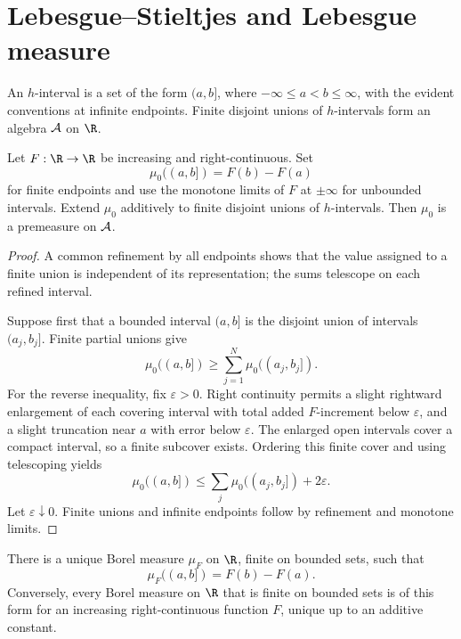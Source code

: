 \section{Lebesgue--Stieltjes and Lebesgue measure}

\begin{de}
An $h$-interval is a set of the form $(a,b]$, where $-\infty\leq a<b\leq\infty$, with the evident conventions at infinite endpoints. Finite disjoint unions of $h$-intervals form an algebra $\mathcal{A}$ on $\R$.
\end{de}

\begin{thm}
Let $F:\R\to\R$ be increasing and right-continuous. Set
\[
\mu_0((a,b])=F(b)-F(a)
\]
for finite endpoints and use the monotone limits of $F$ at $\pm\infty$ for unbounded intervals. Extend $\mu_0$ additively to finite disjoint unions of $h$-intervals. Then $\mu_0$ is a premeasure on $\mathcal{A}$.
\end{thm}

\begin{proof}
A common refinement by all endpoints shows that the value assigned to a finite union is independent of its representation; the sums telescope on each refined interval.

Suppose first that a bounded interval $(a,b]$ is the disjoint union of intervals $(a_j,b_j]$. Finite partial unions give
\[
\mu_0((a,b])\geq\sum_{j=1}^N\mu_0((a_j,b_j]).
\]
For the reverse inequality, fix $\varepsilon>0$. Right continuity permits a slight rightward enlargement of each covering interval with total added $F$-increment below $\varepsilon$, and a slight truncation near $a$ with error below $\varepsilon$. The enlarged open intervals cover a compact interval, so a finite subcover exists. Ordering this finite cover and using telescoping yields
\[
\mu_0((a,b])\leq\sum_j\mu_0((a_j,b_j])+2\varepsilon.
\]
Let $\varepsilon\downarrow0$. Finite unions and infinite endpoints follow by refinement and monotone limits.
\end{proof}

\begin{thm}
There is a unique Borel measure $\mu_F$ on $\R$, finite on bounded sets, such that
\[
\mu_F((a,b])=F(b)-F(a).
\]
Conversely, every Borel measure on $\R$ that is finite on bounded sets is of this form for an increasing right-continuous function $F$, unique up to an additive constant.
\end{thm}

